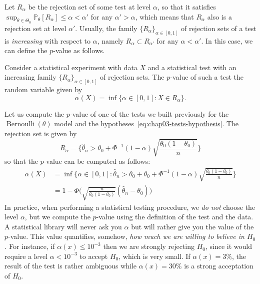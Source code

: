 \documentclass[
	fontsize=11pt, %
	twoside=false, %
	numbers=noenddot, %
]{kaobook}
\DeclareMathOperator{\ber}{Bernoulli}
\renewcommand{\P}{\mathbb P}
\newcommand{\wh}{\widehat}
\begin{document}
Let $R_\alpha$ be the rejection set of some test at level $\alpha$, so that it satisfies $\sup_{\theta \in \Theta_0} \P_\theta[R_\alpha] \leq \alpha < \alpha'$ for any $\alpha' > \alpha$, which means that $R_\alpha$ also is a rejection set at level $\alpha'$.
Usually, the family $\{ R_\alpha \}_{\alpha \in [0, 1]}$ of rejection sets of a test is \emph{increasing} with respect to $\alpha$, namely $R_\alpha \subset R_{\alpha'}$ for any $\alpha < \alpha'$.
In this case, we can define the $p$-value as follows.
\begin{definition}
	Consider a statistical experiment with data $X$ and a statistical test with an increasing family $\{ R_\alpha \}_{\alpha \in [0, 1]}$ of rejection sets.
	The $p$-value of such a test the random variable given by
	\begin{equation*}
		\alpha(X) = \inf \{ \alpha \in [0, 1] : X \in R_\alpha \}.	
	\end{equation*}
\end{definition}
Let us compute the $p$-value of one of the tests we built previously for the $\ber(\theta)$ model and the hypotheses~\eqref{eq:chap03-tests-hypothesis}.
The rejection set is given by
\begin{equation*}
	R_\alpha = \bigg\{ \wh \theta_n > \theta_0 + \Phi^{-1}(1 - \alpha) \sqrt{\frac{\theta_0 
	(1 - \theta_0)}{n}} \bigg \}
\end{equation*}
so that the $p$-value can be computed as follows:
\begin{align*}
	\alpha(X) &= \inf \bigg\{ \alpha \in [0, 1] : \wh \theta_n > \theta_0 + \theta_0 + \Phi^{-1}(1 - \alpha) \sqrt{\frac{\theta_0 (1 - \theta_0)}{n}}  \bigg\} \\
	&= 1 - \Phi\Big(  \sqrt{\frac{n}{\theta_0 (1 - \theta_0)}} (\wh \theta_n - \theta_0) \Big)
\end{align*}
In practice, when performing a statistical testing procedure, we \emph{do not} choose the level $\alpha$, but we compute the $p$-value using the definition of the test and the data.
A statistical library will never ask you $\alpha$ but will rather give you the value of the $p$-value.
This value quantifies, somehow, \emph{how much we are willing to believe in $H_0$.}
For instance, if $\alpha(x) \leq 10^{-3}$
then we are strongly rejecting $H_0$, since it would require a level $\alpha < 10^{-3}$ to accept $H_0$, which is very small. 
If $\alpha(x) = 3\%$, the result of the test is rather ambiguous while $\alpha(x) = 30\%$ is a strong acceptation of $H_0$.
\end{document}
